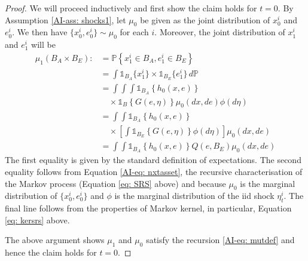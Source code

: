 \documentclass[12pt]{ectaart}
\newcommand{\1}{\mathbbm 1}
\theoremstyle{plain}
\theoremstyle{definition}
\begin{document}
	\begin{proof} 
		
		We will proceed inductively and first show the claim holds for $t=0$. By Assumption \ref{AI-ass: shocks1}, let $\mu_{0}$ be given as the joint distribution of $x_{0}^{i}$ and $e_{0}^{i}$. We then have $\{x_{0}^{i}, e_{0}^{i}\}\sim \mu_{0}$ for each $i$. Moreover, the joint distribution of $x_{1}^{i}$ and $e_{1}^{i}$ will be
		\begin{align*}
		\mu_{1}(B_{A}\times B_{E}) \colon & = \mathbb{P}\left\{x_{1}^{i}\in B_{A}, e_{1}^{i}\in B_{E}\right\}\\
		& = \int \mathbb{1}_{B_{A}}\{x_{1}^{i}\}\times\mathbb{1}_{B_{E}}\{e_{1}^{i}\}\,d\mathbb{P}\\
		& = \int\int \int \mathbb{1}_{B_{A}}\left\{h_{0}(x, e)\right\}\\
		& \quad \times \mathbb{1}_{B}\left\{G(e, \eta)\right\}\mu_{0}(dx, de)\phi(d\eta)\\
		& = \int\int \mathbb{1}_{B_{A}}\left\{h_{0}(x, e)\right\}\\
		& \quad \times \left[\int \mathbb{1}_{B_{E}} \left\{G(e, \eta)\right\}\phi(d\eta)\right]\mu_{0}(dx, de)\\
		& = \int\int \mathbb{1}_{B_{A}}\left\{h_{0}(x, e)\right\} Q(e,B_{E})\mu_{0}(dx, de)
		\end{align*}
		The first equality is given by the standard definition of expectations. The second equality follows from Equation \eqref{AI-eq: nxtasset}, the recursive characterisation of the Markov process (Equation \eqref{eq: SRS} above) and because $\mu_{0}$ is the marginal distribution of $\{x_{0}^{i},e_{0}^{i}\}$ and $\phi$ is the marginal distribution of the {\sc iid} shock $\eta^{i}_{t}$. The final line follows from the properties of  Markov kernel, in particular, Equation \eqref{eq: kersrs} above. 
		
		The above argument shows $\mu_{1}$ and $\mu_{0}$ satisfy the recursion \eqref{AI-eq: mutdef} and hence the claim holds for $t=0$. 
		

\end{proof}
\end{document}
